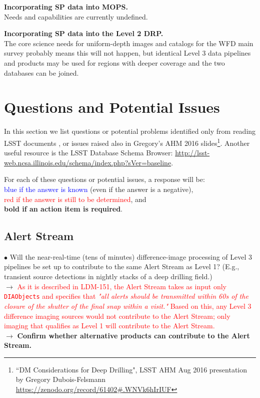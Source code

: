 \documentclass[DM,lsstdraft,toc]{lsstdoc}
\begin{document}
\noindent \textbf{Incorporating SP data into MOPS.} \\
Needs and capabilities are currently undefined.

\noindent \textbf{Incorporating SP data into the Level 2 DRP.} \\
The core science needs for uniform-depth images and catalogs for the WFD main survey probably means this will not happen, but identical Level 3 data pipelines and products may be used for regions with deeper coverage and the two databases can be joined.




\clearpage
\section{Questions and Potential Issues}\label{sec:issues}

In this section we list questions or potential problems identified only from reading LSST documents \citep{LSE-163,LDM-151}, or issues raised also in Gregory's AHM 2016 slides\footnote{``DM Considerations for Deep Drilling", LSST AHM Aug 2016 presentation by Gregory Dubois-Felsmann \url{https://zenodo.org/record/61402\#.WNVk6hIrIUF}}. Another useful resource is the LSST Database Schema Browser: \url{http://lsst-web.ncsa.illinois.edu/schema/index.php?sVer=baseline}.

For each of these questions or potential issues, a response will be: \\
\textcolor{blue}{blue if the answer is known} (even if the answer is a negative), \\
\textcolor{red}{red if the answer is still to be determined}, and \\
\textbf{bold if an action item is required}.

\subsection{Alert Stream}\label{ssec:issues_alerts}

$\bullet$ Will the near-real-time (tens of minutes) difference-image processing of Level 3 pipelines be set up to contribute to the same Alert Stream as Level 1? (E.g., transient source detections in nightly stacks of a deep drilling field.) \\
$\rightarrow$  \textcolor{red}{As it is described in LDM-151, the Alert Stream takes as input only {\tt DIAObjects} and specifies that {\it "all alerts should be transmitted within 60s of the closure of the shutter of the final snap within a visit."} Based on this, any Level 3 difference imaging sources would not contribute to the Alert Stream; only imaging that qualifies as Level 1 will contribute to the Alert Stream.} \\
$\rightarrow$ \textbf{Confirm whether alternative products can contribute to the Alert Stream.}
\end{document}
